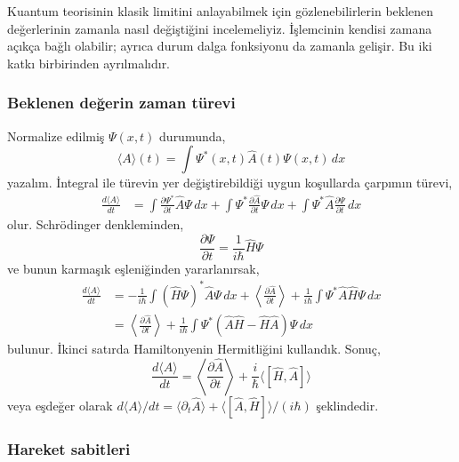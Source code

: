 Kuantum teorisinin klasik limitini anlayabilmek için gözlenebilirlerin
beklenen değerlerinin zamanla nasıl değiştiğini incelemeliyiz.
İşlemcinin kendisi zamana açıkça bağlı olabilir; ayrıca durum dalga
fonksiyonu da zamanla gelişir. Bu iki katkı birbirinden ayrılmalıdır.

\subsubsection{Beklenen değerin zaman türevi}

Normalize edilmiş $\Psi(x,t)$ durumunda,
\begin{equation}
 \langle A\rangle(t)=\int\Psi^*(x,t)\hat A(t)\Psi(x,t)\,dx
\end{equation}
yazalım. İntegral ile türevin yer değiştirebildiği uygun
koşullarda çarpımın türevi,
\begin{align}
 \frac{d\langle A\rangle}{dt}
 &=\int\frac{\partial\Psi^*}{\partial t}\hat A\Psi\,dx
 +\int\Psi^*\frac{\partial\hat A}{\partial t}\Psi\,dx
 +\int\Psi^*\hat A\frac{\partial\Psi}{\partial t}\,dx
 \label{eq:05_zaman_uc_terim}
\end{align}
olur. Schrödinger denkleminden,
\begin{equation}
 \frac{\partial\Psi}{\partial t}=\frac{1}{i\hbar}\hat H\Psi
\end{equation}
ve bunun karmaşık eşleniğinden yararlanırsak,
\begin{align}
 \frac{d\langle A\rangle}{dt}
 &=-\frac{1}{i\hbar}\int(\hat H\Psi)^*\hat A\Psi\,dx
 +\left\langle\frac{\partial\hat A}{\partial t}\right\rangle
 +\frac{1}{i\hbar}\int\Psi^*\hat A\hat H\Psi\,dx\\
 &=\left\langle\frac{\partial\hat A}{\partial t}\right\rangle
 +\frac{1}{i\hbar}\int\Psi^*
       (\hat A\hat H-\hat H\hat A)\Psi\,dx
\end{align}
bulunur. İkinci satırda Hamiltonyenin Hermitliğini kullandık.
Sonuç,
\begin{equation}
 \boxed{\frac{d\langle A\rangle}{dt}
 =\left\langle\frac{\partial\hat A}{\partial t}\right\rangle
 +\frac{i}{\hbar}\langle[\hat H,\hat A]\rangle}
 \label{eq:05_genel_ehrenfest}
\end{equation}
veya eşdeğer olarak
$d\langle A\rangle/dt=\langle\partial_t\hat A\rangle
+\langle[\hat A,\hat H]\rangle/(i\hbar)$ şeklindedir.

\subsubsection{Hareket sabitleri}


